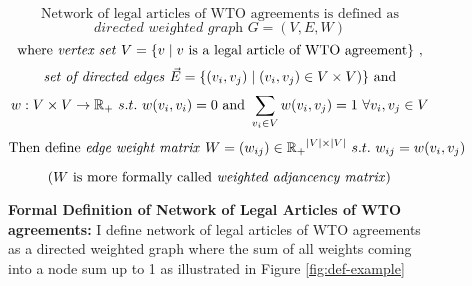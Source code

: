 \begin{figure}[ht]
    \[\text{Network of legal articles of WTO agreements is defined as}\] %
    \[ \textit{directed weighted graph }G = (V, E, W) \]
    \[\text{ where \textit{vertex set} } V = \{v \mid v\text{ is a legal article of WTO agreement}\}  \text{ , } \]
    \[\text{ \textit{set of directed edges }}\vec{E} = \{(v_i, v_j) \mid (v_i, v_j)\in V \times V)\} \text{ and } \]
    \[w : V \times V \to \Bbb R_{+} \text{ } s.t. \text{ } w(v_i, v_i) = 0 \text{ and } \sum_{v_i\in V}{w(v_i, v_j)} = 1 \text{  } \forall v_i, v_j \in V \]%
    \[\text{Then define \textit{edge weight matrix }}W=(w_{ij}) \in \Bbb{R_{+}}^{|V| \times |V|} \text{ } s.t. \text{ } w_{ij} = w(v_i, v_j) \] %

    \[(W \text{ is more formally called \textit{weighted adjancency matrix}})\]
    \caption{\textbf{Formal Definition of Network of Legal Articles of WTO agreements: }I define network of legal articles of WTO agreements
        as a directed weighted graph where the sum of all weights coming into a node sum up to 1 as illustrated in Figure \ref{fig:def-example}}
    \label{fig:def}
\end{figure}

